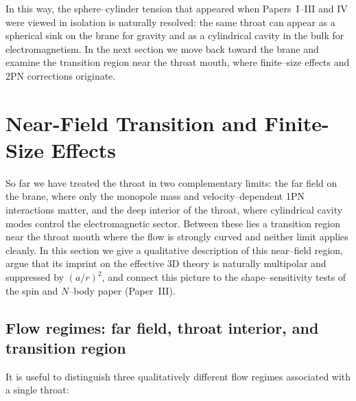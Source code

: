 \documentclass[12pt]{article}
\begin{document}
In this way, the sphere--cylinder tension that appeared when Papers~I--III
and IV were viewed in isolation is naturally resolved: the same throat can
appear as a spherical sink on the brane for gravity and as a cylindrical
cavity in the bulk for electromagnetism.  In the next section we move back
toward the brane and examine the transition region near the throat mouth,
where finite--size effects and 2PN corrections originate.

\section{Near-Field Transition and Finite-Size Effects}
\label{sec:near_field}

So far we have treated the throat in two complementary limits: the far field
on the brane, where only the monopole mass and velocity--dependent 1PN
interactions matter, and the deep interior of the throat, where cylindrical
cavity modes control the electromagnetic sector.  Between these lies a
transition region near the throat mouth where the flow is strongly curved
and neither limit applies cleanly.  In this section we give a qualitative
description of this near--field region, argue that its imprint on the
effective 3D theory is naturally multipolar and suppressed by $(a/r)^2$, and
connect this picture to the shape--sensitivity tests of the spin and
$N$--body paper (Paper~III).

\subsection{Flow regimes: far field, throat interior, and transition region}
\label{subsec:flow_regimes}

It is useful to distinguish three qualitatively different flow regimes
associated with a single throat:
\end{document}
